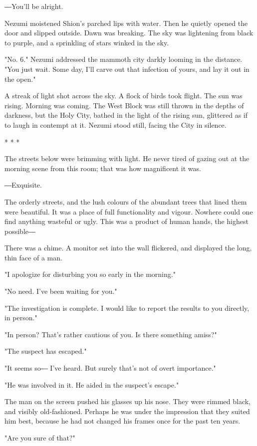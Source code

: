 ―You'll be alright.

Nezumi moistened Shion's parched lips with water. Then he quietly opened
the door and slipped outside. Dawn was breaking. The sky was lightening
from black to purple, and a sprinkling of stars winked in the sky.

"No. 6." Nezumi addressed the mammoth city darkly looming in the
distance. "You just wait. Some day, I'll carve out that infection of
yours, and lay it out in the open."

A streak of light shot across the sky. A flock of birds took flight. The
sun was rising. Morning was coming. The West Block was still thrown in
the depths of darkness, but the Holy City, bathed in the light of the
rising sun, glittered as if to laugh in contempt at it. Nezumi stood
still, facing the City in silence.

* * *

The streets below were brimming with light. He never tired of gazing out
at the morning scene from this room; that was how magnificent it was.

―Exquisite.

The orderly streets, and the lush colours of the abundant trees that
lined them were beautiful. It was a place of full functionality and
vigour. Nowhere could one find anything wasteful or ugly. This was a
product of human hands, the highest possible―

There was a chime. A monitor set into the wall flickered, and displayed
the long, thin face of a man.

"I apologize for disturbing you so early in the morning."

"No need. I've been waiting for you."

"The investigation is complete. I would like to report the results to
you directly, in person."

"In person? That's rather cautious of you. Is there something amiss?"

"The suspect has escaped."

"It seems so― I've heard. But surely that's not of overt importance."

"He was involved in it. He aided in the suspect's escape."

The man on the screen pushed his glasses up his nose. They were rimmed
black, and visibly old-fashioned. Perhaps he was under the impression
that they suited him best, because he had not changed his frames once
for the past ten years.

"Are you sure of that?"

